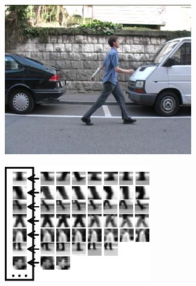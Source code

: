 \begin{figure}
  \begin{centering}
    \begin{subfigure}[b]{.3\textwidth}
      \includegraphics[width=1\linewidth]{bilder/pedestrian/pedest-000.jpg}
    \end{subfigure}
    \begin{subfigure}[b]{.3\textwidth}
      \includegraphics[width=1\linewidth]{bilder/pedestrian/pedest-001.jpg}
    \end{subfigure}
    \begin{subfigure}[b]{.3\textwidth}

\end{subfigure}
\end{centering}
\end{figure}
